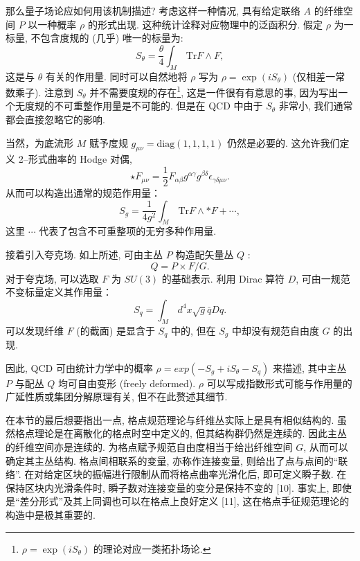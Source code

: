 \documentclass{article}
\begin{document}
\par 那么量子场论应如何用该机制描述? 考虑这样一种情况, 具有给定联络 $A$ 的纤维空间 $P$ 以一种概率 $\rho$ 的形式出现. 这种统计诠释对应物理中的泛函积分. 假定 $\rho$ 为一标量, 不包含度规的 (几乎) 唯一的标量为:
\begin{equation}
S_{\theta}=\frac{\theta}{4}\int_{M}\,\textrm{Tr}F\wedge F,
\end{equation}
这是与 $\theta$ 有关的作用量. 同时可以自然地将 $\rho$ 写为 $\rho=\exp(iS_{\theta})$ (仅相差一常数乘子). 注意到
 $S_{\theta}$ 并不需要度规的存在\footnote{$\rho=\exp(iS_{\theta})$ 的理论对应一类拓扑场论.}, 这是一件很有有意思的事,
 因为写出一个无度规的不可重整作用量是不可能的. 但是在 QCD 中由于 $S_{\theta}$ 非常小, 我们通常都会直接忽略它的影响.
\par 当然，为底流形 $M$ 赋予度规 $g_{\mu\nu}=\textrm{diag}(1,1,1,1)$ 仍然是必要的. 这允许我们定义 2--形式曲率的 Hodge 对偶,
\begin{equation}
\star F_{\mu\nu}=\frac{1}{2}F_{\alpha\beta}g^{\alpha\gamma}g^{\beta\delta}\epsilon_{\gamma\delta\mu\nu}.
\end{equation}
从而可以构造出通常的规范作用量：
\begin{equation}
S_{g}=\frac{1}{4g^{2}}\int_{M}\,\textrm{Tr}F\wedge *F+ \cdots,
\end{equation}
这里 $\cdots$ 代表了包含不可重整项的无穷多种作用量.
\par 接着引入夸克场. 如上所述, 可由主丛 $P$ 构造配矢量丛 $Q$ :
\begin{equation}
Q=P\times F/G.
\end{equation}
对于夸克场, 可以选取 $F$ 为 $SU(3)$ 的基础表示. 利用 Dirac 算符 $D$, 可由一规范不变标量定义其作用量：
\begin{equation}
S_{q}=\int_{M}\,d^{4}x\sqrt{g}\bar{q}Dq.
\end{equation}
可以发现纤维 $F$ (的截面) 是显含于 $S_{q}$ 中的, 但在 $S_{g}$ 中却没有规范自由度 $G$ 的出现.

\par 因此, QCD 可由统计力学中的概率 $\rho= exp(-S_g +iS_\theta-S_q)$ 来描述, 其中主丛 $P$ 与配丛 $Q$ 均可自由变形 (freely deformed). $\rho$ 可以写成指数形式可能与作用量的广延性质或集团分解原理有关, 但不在此赘述其细节.

\par 在本节的最后想要指出一点, 格点规范理论与纤维丛实际上是具有相似结构的. 虽然格点理论是在离散化的格点时空中定义的, 但其结构群仍然是连续的. 因此主丛的纤维空间亦是连续的. 为格点赋予规范自由度相当于给出纤维空间 $G$, 从而可以确定其主丛结构. 格点间相联系的变量, 亦称作连接变量, 则给出了点与点间的``联络''. 在对给定区块的振幅进行限制从而将格点曲率光滑化后, 即可定义瞬子数. 在保持区块内光滑条件时, 瞬子数对连接变量的变分是保持不变的 [10]. 事实上, 即使是``差分形式''及其上同调也可以在格点上良好定义 [11], 这在格点手征规范理论的构造中是极其重要的.
\end{document}
